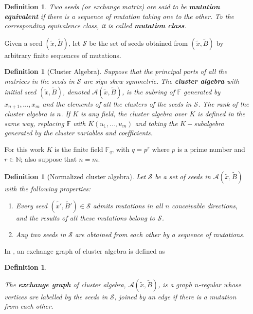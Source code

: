 \documentclass[12pt,a4paper]{article}
\newtheorem{definition}[Theorem]{Definition}
\begin{document}
\begin{definition}
Two seeds (or exchange matrix) are said to be \textbf{mutation equivalent} if there is a sequence of mutation taking one to the other. To the corresponding equivalence class, it is called \textbf{mutation class}.
\label{def1}
\end{definition}

Given a seed $(\tilde{x},\tilde{B})$, let $\mathcal{S}$ be the set of seeds obtained from $(\tilde{x},\tilde{B})$ by arbitrary finite sequences of mutations.

\begin{definition}[Cluster Algebra]
Suppose that the principal parts of all the matrices in the seeds in $\mathcal{S}$ are sign skew symmetric. The \textbf{cluster algebra} with initial seed $(\tilde{x},\tilde{B})$, denoted $\mathcal{A}(\tilde{x},\tilde{B})$, is the subring of $\mathbb{F}$ generated by $x_{n+1},\ldots, x_m$ and the elements of all the clusters of the seeds in $\mathcal{S}$. The \textit{rank} of the cluster algebra is $n$. If $K$ is any field, the cluster algebra over $K$ is defined in the same way, replacing $\mathbb{F}$ with $K(u_1,\ldots,u_m)$ and taking the $K-$subalgebra generated by the cluster variables and coefficients.
\end{definition}

For this work $K$ is the finite field $\mathbb{F}_q$, with $q=p^r$ where $p$ is a prime number and $r\in\mathbb{N}$; also suppose that $n=m$.

\begin{definition}[Normalized cluster algebra]
Let $\mathcal{S}$ be a set of seeds in $\mathcal{A}(\tilde{x},\tilde{B})$ with the following properties:
\begin{enumerate}
\item Every seed $(\tilde{x'},\tilde{B'}) \in \mathcal{S}$ admits mutations in all $n$ conceivable directions, and the results of all these mutations belong to $\mathcal{S}$.
\item Any two seeds in $\mathcal{S}$ are obtained from each other by a sequence of mutations.
\end{enumerate}
\end{definition}

In \cite{fomin1}, an exchange graph of cluster algebra is defined as

\begin{definition}\label{exchgraph}

The \textbf{exchange graph} of cluster algebra, $\mathcal{A}(\tilde{x},\tilde{B})$, is a graph $n$-regular whose vertices are labelled by the seeds in $\mathcal{S}$, joined by an edge if there is a mutation from each other.
\label{def11}
\end{definition}
\end{document}
